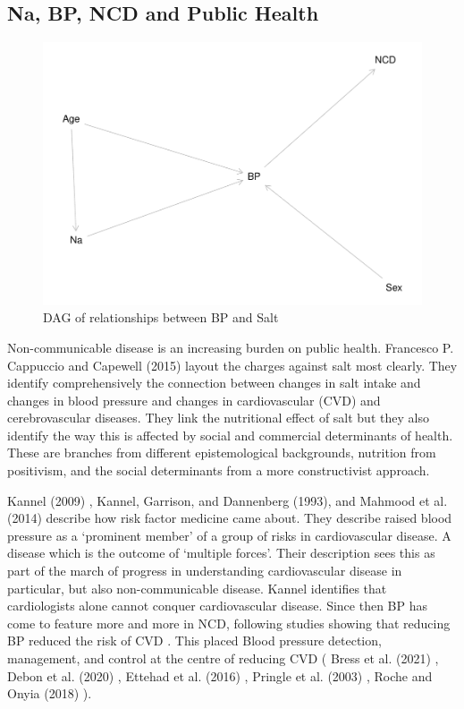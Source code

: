 \documentclass[
]{article}
\begin{document}
\hypertarget{na-bp-ncd-and-public-health}{%
\subsection{Na, BP, NCD and Public
Health}\label{na-bp-ncd-and-public-health}}

\begin{figure}
\centering
\includegraphics{methodandresults_files/figure-latex/fig-dagNa-1.pdf}
\caption{DAG of relationships between BP and Salt}
\end{figure}

Non-communicable disease is an increasing burden on public health.
Francesco P. Cappuccio and Capewell (2015) layout the charges against
salt most clearly. They identify comprehensively the connection between
changes in salt intake and changes in blood pressure and changes in
cardiovascular (CVD) and cerebrovascular diseases. They link the
nutritional effect of salt but they also identify the way this is
affected by social and commercial determinants of health. These are
branches from different epistemological backgrounds, nutrition from
positivism, and the social determinants from a more constructivist
approach.

Kannel (2009) , Kannel, Garrison, and Dannenberg (1993), and Mahmood et
al. (2014) describe how risk factor medicine came about. They describe
raised blood pressure as a `prominent member' of a group of risks in
cardiovascular disease. A disease which is the outcome of `multiple
forces'. Their description sees this as part of the march of progress in
understanding cardiovascular disease in particular, but also
non-communicable disease. Kannel identifies that cardiologists alone
cannot conquer cardiovascular disease. Since then BP has come to feature
more and more in NCD, following studies showing that reducing BP reduced
the risk of CVD . This placed Blood pressure detection, management, and
control at the centre of reducing CVD ( Bress et al. (2021) , Debon et
al. (2020) , Ettehad et al. (2016) , Pringle et al. (2003) , Roche and
Onyia (2018) ).
\end{document}
